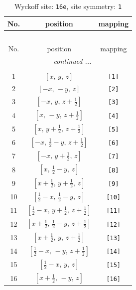 \documentclass[fleqn,8pt]{jsarticle}
\begin{document}
\begin{longtable}{ccc}
\caption{Wyckoff site: {\tt 16e}, site symmetry: {\tt 1}}
 \\
 \hline \hline
No. & position & mapping \\ \hline \endfirsthead

\multicolumn{2}{l}{\tablename\ \thetable{}} \\
 \hline \hline
No. & position & mapping \\ \hline \endhead

 \hline \hline
\multicolumn{2}{r}{\footnotesize\it continued ...} \\ \endfoot

 \hline \hline
\multicolumn{2}{r}{} \\ \endlastfoot

1 & $\left[ x,\, y,\, z \right]$ & {\tt [1]} \\ \hline
2 & $\left[ - x,\, - y,\, z \right]$ & {\tt [2]} \\ \hline
3 & $\left[ - x,\, y,\, z + \frac{1}{2} \right]$ & {\tt [3]} \\ \hline
4 & $\left[ x,\, - y,\, z + \frac{1}{2} \right]$ & {\tt [4]} \\ \hline
5 & $\left[ x,\, y + \frac{1}{2},\, z + \frac{1}{2} \right]$ & {\tt [5]} \\ \hline
6 & $\left[ - x,\, \frac{1}{2} - y,\, z + \frac{1}{2} \right]$ & {\tt [6]} \\ \hline
7 & $\left[ - x,\, y + \frac{1}{2},\, z \right]$ & {\tt [7]} \\ \hline
8 & $\left[ x,\, \frac{1}{2} - y,\, z \right]$ & {\tt [8]} \\ \hline
9 & $\left[ x + \frac{1}{2},\, y + \frac{1}{2},\, z \right]$ & {\tt [9]} \\ \hline
10 & $\left[ \frac{1}{2} - x,\, \frac{1}{2} - y,\, z \right]$ & {\tt [10]} \\ \hline
11 & $\left[ \frac{1}{2} - x,\, y + \frac{1}{2},\, z + \frac{1}{2} \right]$ & {\tt [11]} \\ \hline
12 & $\left[ x + \frac{1}{2},\, \frac{1}{2} - y,\, z + \frac{1}{2} \right]$ & {\tt [12]} \\ \hline
13 & $\left[ x + \frac{1}{2},\, y,\, z + \frac{1}{2} \right]$ & {\tt [13]} \\ \hline
14 & $\left[ \frac{1}{2} - x,\, - y,\, z + \frac{1}{2} \right]$ & {\tt [14]} \\ \hline
15 & $\left[ \frac{1}{2} - x,\, y,\, z \right]$ & {\tt [15]} \\ \hline
16 & $\left[ x + \frac{1}{2},\, - y,\, z \right]$ & {\tt [16]} \\
\end{longtable}
\end{document}
